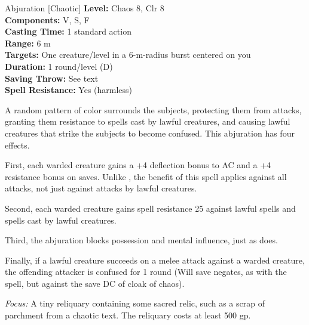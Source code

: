 {Abjuration [Chaotic]}
{
	\textbf{Level:}
	Chaos 8, Clr 8\\
	\textbf{Components:}
	V, S, F\\
	\textbf{Casting Time:}
	1 standard action\\
	\textbf{Range:}
	6 m\\
	\textbf{Targets:}
	One creature/level in a 6-m-radius burst centered on you\\
	\textbf{Duration:}
	1 round/level (D)\\
	\textbf{Saving Throw:}
	See text\\
	\textbf{Spell Resistance:}
	Yes (harmless)\\
}
{
	A random pattern of color surrounds the subjects, protecting them from attacks, granting them resistance to spells cast by lawful creatures, and causing lawful creatures that strike the subjects to become confused. This abjuration has four effects.

	First, each warded creature gains a +4 deflection bonus to AC and a +4 resistance bonus on saves. Unlike , the benefit of this spell applies against all attacks, not just against attacks by lawful creatures.

	Second, each warded creature gains spell resistance 25 against lawful spells and spells cast by lawful creatures.

	Third, the abjuration blocks possession and mental influence, just as  does.

	Finally, if a lawful creature succeeds on a melee attack against a warded creature, the offending attacker is confused for 1 round (Will save negates, as with the  spell, but against the save DC of cloak of chaos).

	\textit{Focus:}
	A tiny reliquary containing some sacred relic, such as a scrap of parchment from a chaotic text. The reliquary costs at least 500 gp.

}
